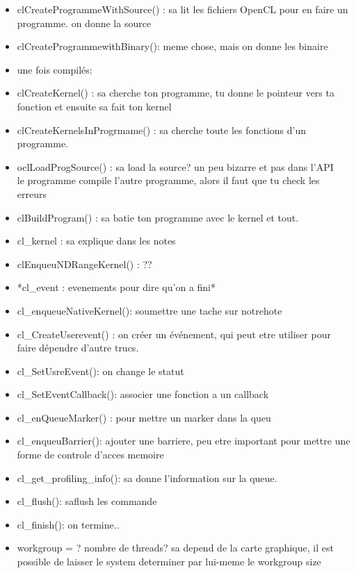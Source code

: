 \documentclass[oneside]{book}
\begin{document}
\begin{itemize}
	

\item clCreateProgrammeWithSource() : sa lit les fichiers OpenCL pour en faire un programme. on donne la source

\item clCreateProgrammewithBinary(): meme chose, mais on donne les binaire

\item une fois compilés:


\item clCreateKernel() : sa cherche ton programme, tu donne le pointeur vers ta fonction et ensuite sa fait ton kernel

\item clCreateKernelsInProgrmame() : sa cherche toute les fonctions d'un programme.

\item oclLoadProgSource() : sa load la source? un peu bizarre et pas dans l'API \\

le programme compile l'autre programme, alors il faut que tu check les erreurs

\item clBuildProgram() : sa batie ton programme avec le kernel et tout.

\item cl\_kernel : sa explique dans les notes

\item clEnqueuNDRangeKernel() :  ??

\item *cl\_event : evenements pour dire qu'on a fini*

\item cl\_enqueueNativeKernel(): soumettre une tache sur notrehote

\item cl\_CreateUserevent() : on créer un événement, qui peut etre utiliser pour faire dépendre d'autre trucs.

\item cl\_SetUsreEvent(): on change le statut

\item cl\_SetEventCallback(): associer une fonction a un callback

\item cl\_enQueueMarker() : pour mettre un marker dans la queu

\item cl\_enqueuBarrier(): ajouter une barriere, peu etre important pour mettre une forme de controle d'acces memoire

\item cl\_get\_profiling\_info(): sa donne l'information sur la queue.

\item cl\_flush(): saflush les commande

\item cl\_finish(): on termine..

\item workgroup = ? nombre de threads? sa depend de la carte graphique, il est possible de laisser le system determiner par lui-meme le workgroup size
\end{itemize}
\end{document}
